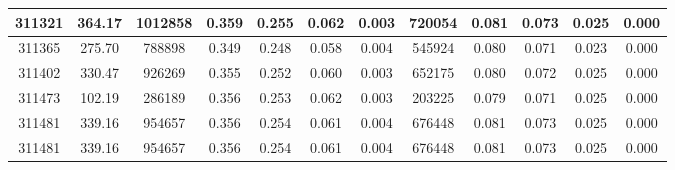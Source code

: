 \documentclass[10pt]{extarticle}
\begin{document}
\begin{longtable}{|c|c|c|c|c|c|c|c|c|c|c|c|}
\hline 
311321&364.17&1012858&0.359&0.255&0.062&0.003&720054&0.081&0.073&0.025&0.000 \\ 
\hline 
311365&275.70&788898&0.349&0.248&0.058&0.004&545924&0.080&0.071&0.023&0.000 \\ 
\hline 
311402&330.47&926269&0.355&0.252&0.060&0.003&652175&0.080&0.072&0.025&0.000 \\ 
\hline 
311473&102.19&286189&0.356&0.253&0.062&0.003&203225&0.079&0.071&0.025&0.000 \\ 
\hline 
311481&339.16&954657&0.356&0.254&0.061&0.004&676448&0.081&0.073&0.025&0.000 \\ 
\hline 
311481&339.16&954657&0.356&0.254&0.061&0.004&676448&0.081&0.073&0.025&0.000 \\ 
\hline 
\end{longtable} 
\end{document}
